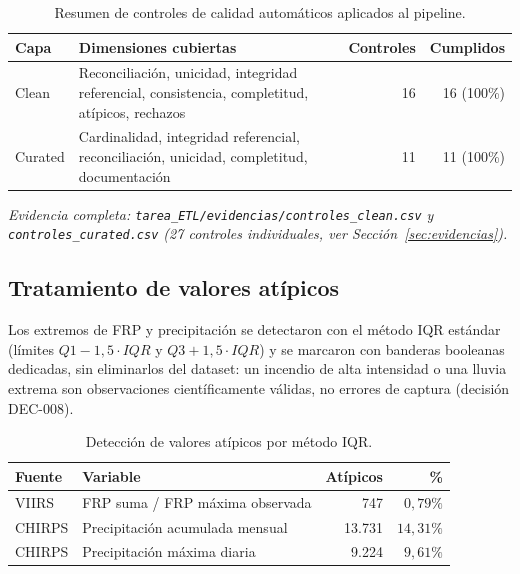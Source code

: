 \documentclass[11pt,a4paper]{article}
\begin{document}
\begin{table}[H]
\centering
\small
\caption{Resumen de controles de calidad autom\'aticos aplicados al pipeline.}
\label{tab:controles_clean}
\begin{tabularx}{\textwidth}{@{}lXrr@{}}
\toprule
\textbf{Capa} & \textbf{Dimensiones cubiertas} & \textbf{Controles} & \textbf{Cumplidos} \\
\midrule
Clean & Reconciliaci\'on, unicidad, integridad referencial, consistencia, completitud, at\'ipicos, rechazos & 16 & 16 (100\%) \\
Curated & Cardinalidad, integridad referencial, reconciliaci\'on, unicidad, completitud, documentaci\'on & 11 & 11 (100\%) \\
\bottomrule
\end{tabularx}
\end{table}
\noindent\textit{Evidencia completa: \texttt{tarea\_ETL/evidencias/controles\_clean.csv} y \texttt{controles\_curated.csv} (27 controles individuales, ver Secci\'on~\ref{sec:evidencias}).}

\subsection{Tratamiento de valores at\'ipicos}
\label{sec:atipicos}
Los extremos de FRP y precipitaci\'on se detectaron con el m\'etodo IQR est\'andar (l\'imites $Q1 - 1{,}5 \cdot IQR$ y $Q3 + 1{,}5 \cdot IQR$) y se marcaron con banderas booleanas dedicadas, sin eliminarlos del dataset: un incendio de alta intensidad o una lluvia extrema son observaciones cient\'ificamente v\'alidas, no errores de captura (decisi\'on DEC-008).

\begin{table}[H]
\centering
\small
\caption{Detecci\'on de valores at\'ipicos por m\'etodo IQR.}
\label{tab:atipicos}
\begin{tabular}{@{}llrr@{}}
\toprule
\textbf{Fuente} & \textbf{Variable} & \textbf{At\'ipicos} & \textbf{\%} \\
\midrule
VIIRS & FRP suma / FRP m\'axima observada & 747 & $0{,}79\%$ \\
CHIRPS & Precipitaci\'on acumulada mensual & 13.731 & $14{,}31\%$ \\
CHIRPS & Precipitaci\'on m\'axima diaria & 9.224 & $9{,}61\%$ \\
\bottomrule
\end{tabular}
\end{table}
\end{document}
